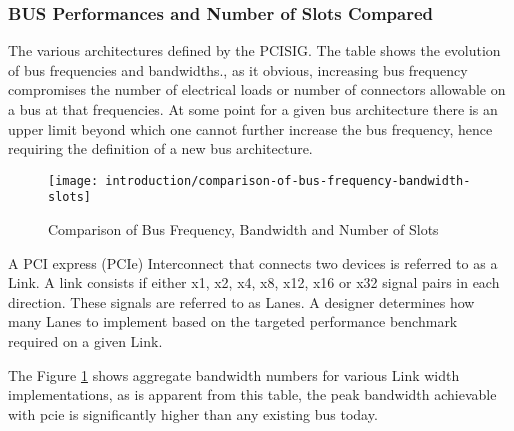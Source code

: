\subsubsection{BUS Performances and Number of Slots Compared}
The various architectures defined by the PCISIG. The table shows the evolution of bus frequencies and bandwidths., as it obvious, increasing bus frequency compromises the number of electrical loads or number of connectors allowable on a bus at that frequencies. At some point for a given bus architecture there is an upper limit beyond which one cannot further increase the bus frequency, hence requiring the definition of a new bus architecture.

\begin{figure}[!htbp]
	\centering
	\texttt{[image: introduction/comparison-of-bus-frequency-bandwidth-slots]}
	\caption{Comparison of Bus Frequency, Bandwidth and Number of Slots}\label{fig:comparison-of-bus-frequency-bandwidth-slots}
\end{figure}

A PCI express (PCIe) Interconnect that connects two devices is referred to as a Link. A link consists if either x1, x2, x4, x8, x12, x16 or x32 signal pairs in each direction. These signals are referred to as Lanes. A designer determines how many Lanes to implement based on the targeted performance benchmark required on a given Link.


The Figure \ref{fig:comparison-of-bus-frequency-bandwidth-slots} shows aggregate bandwidth numbers for various Link width implementations, as is apparent from this table, the peak bandwidth achievable with \gls{pcie} is significantly higher than any existing bus today.



